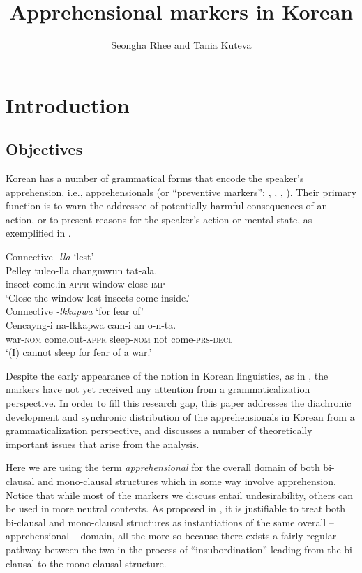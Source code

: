 \documentclass[output=paper,colorlinks,citecolor=brown]{langscibook}
\author{Seongha Rhee\affiliation{Mahidol University; Hankuk University of Foreign Studies} and Tania Kuteva\affiliation{Heinrich-Heine-Universität Düsseldorf; SOAS, University of London}}
\title{Apprehensional markers in Korean}
\begin{document}
\maketitle


\section{Introduction}
\label{sec:rhee:introduction}

\subsection{Objectives}
\label{subsec:objectives}

Korean has a number of grammatical forms that encode the speaker's apprehension, i.e., apprehensionals (or ``preventive markers''; \citealt{Ramstedt1997}, \citealt{Kim1960}, \citealt{Ko1989}, \citealt{Son1994}). Their primary function is to warn the addressee of potentially harmful consequences of an action, or to present reasons for the speaker's action or mental state, as exemplified in .


\ea \label{ex:RK1}
\ea \label{ex:RK1a} \textup{Connective} \textit{-lla} \textup{`lest'} \\
\gll Pelley tuleo-lla changmwun tat-ala. \\
insect come.in-\textsc{appr} window close-\textsc{imp} \\
\glt `Close the window lest insects come inside.' \\
\ex \label{ex:RK1b} \textup{Connective} \textit{-lkkapwa} \textup{`for fear of'} \\
\gll Cencayng-i na-lkkapwa cam-i an o-n-ta. \\
war-\textsc{nom} come.out-\textsc{appr} sleep-\textsc{nom} not come-\textsc{prs-decl} \\
\glt `(I) cannot sleep for fear of a war.'
\z
\z

 Despite the early appearance of the notion in Korean linguistics, as in \citet{Ramstedt1997}, the markers have not yet received any attention from a grammaticalization perspective. In order to fill this research gap, this paper addresses the diachronic development and synchronic distribution of the apprehensionals in Korean from a grammaticalization perspective, and discusses a number of theoretically important issues that arise from the analysis. 

Here we are using the term \textit{apprehensional} for the overall domain of both bi-clausal and mono-clausal structures which in some way involve apprehension. Notice that while most of the markers we discuss entail undesirability, others can be used in more neutral contexts. As proposed in \citet[865]{kutevaetal2019}, it is justifiable to treat both bi-clausal and mono-clausal structures as instantiations of the same overall -- apprehensional -- domain, all the more so because there exists a fairly regular pathway between the two in the process of ``insubordination'' \citep{evans2007,EvansWatanabe2016} leading from the bi-clausal to the mono-clausal structure.
\end{document}
